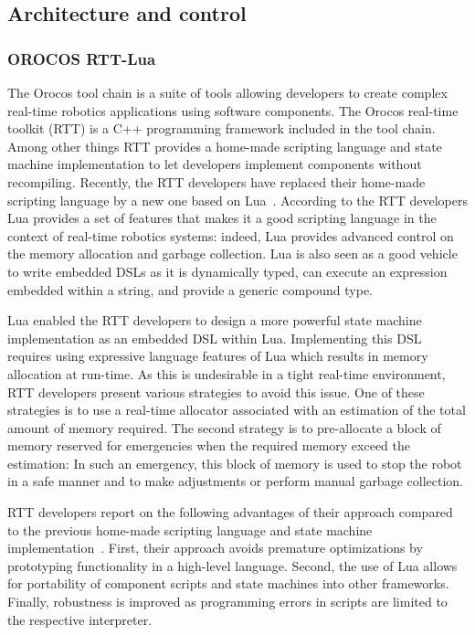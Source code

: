\subsection{Architecture and control}

\subsubsection{OROCOS RTT-Lua}

The Orocos tool chain is a suite of tools allowing developers to
create complex real-time robotics applications using software
components. The Orocos real-time toolkit (RTT) is a C++ programming
framework included in the tool chain. Among other things RTT provides
a home-made scripting language and state machine implementation to let
developers implement components without recompiling. Recently, the RTT
developers have replaced their home-made scripting language by a new
one based on Lua~\cite{Klotzbucher:2010fk}. According to the RTT
developers Lua provides a set of features that makes it a good
scripting language in the context of real-time robotics systems:
indeed, Lua provides advanced control on the memory allocation and
garbage collection. Lua is also seen as a good vehicle to write
embedded DSLs as it is dynamically typed, can execute an expression
embedded within a string, and provide a generic compound type.

Lua enabled the RTT developers to design a more powerful state machine
implementation as an embedded DSL within Lua. Implementing this DSL
requires using expressive language features of Lua which results in
memory allocation at run-time. As this is undesirable in a tight
real-time environment, RTT developers present various strategies to
avoid this issue. One of these strategies is to use a real-time
allocator associated with an estimation of the total amount of memory
required. The second strategy is to pre-allocate a block of memory
reserved for emergencies when the required memory exceed the
estimation: In such an emergency, this block of memory is used to stop
the robot in a safe manner and to make adjustments or perform manual
garbage collection.

RTT developers report on the following advantages of their approach
compared to the previous home-made scripting language and state
machine implementation~\cite{Klotzbucher:2010fk}. First, their
approach avoids premature optimizations by prototyping functionality
in a high-level language. Second, the use of Lua allows for
portability of component scripts and state machines into other
frameworks. Finally, robustness is improved as programming errors in
scripts are limited to the respective interpreter.


